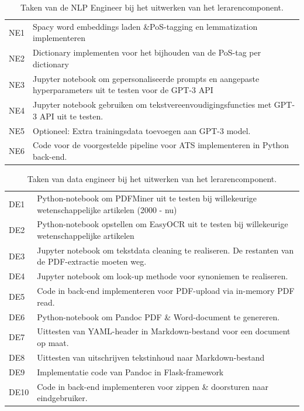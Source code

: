 \begin{center}
	\begin{table}[H]
		\begin{tabular}{ | m{2cm} | m{12cm} | } 
			\hline
			NE1 & Spacy word embeddings laden \&PoS-tagging en lemmatization implementeren \\
			NE2 & Dictionary implementen voor het bijhouden van de PoS-tag per dictionary \\
			NE3 & Jupyter notebook om gepersonaliseerde prompts en aangepaste hyperparameters uit te testen voor de GPT-3 API \\
			NE4 & Jupyter notebook gebruiken om tekstvereenvoudigingsfuncties met GPT-3 API uit te testen. \\
			NE5 & Optioneel: Extra trainingsdata toevoegen aan GPT-3 model. \\
			NE6 & Code voor de voorgestelde pipeline voor ATS implementeren in Python back-end. \\
			\hline
		\end{tabular}
		\caption{Taken van de NLP Engineer bij het uitwerken van het lerarencomponent.}
		\label{table:tasks-nlp-engineer}
	\end{table}
\end{center}


\begin{center}
	\begin{table}[H]
		\begin{tabular}{|m{2cm}|m{12cm}|}
			\hline
			DE1	& Python-notebook om PDFMiner uit te testen bij willekeurige wetenschappelijke artikelen (2000 - nu) \\
			DE2 & Python-notebook opstellen om EasyOCR uit te testen bij willekeurige wetenschappelijke artikelen \\
			DE3 & Jupyter notebook om tekstdata cleaning te realiseren. De restanten van de PDF-extractie moeten weg. \\
			DE4 & Jupyter notebook om look-up methode voor synoniemen te realiseren. \\
			DE5 & Code in back-end implementeren voor PDF-upload via in-memory PDF read. \\
			DE6 & Python-notebook om Pandoc PDF \& Word-document te genereren. \\
			DE7 & Uittesten van YAML-header in Markdown-bestand voor een document op maat. \\
			DE8 & Uittesten van uitschrijven tekstinhoud naar Markdown-bestand \\
			DE9 & Implementatie code van Pandoc in Flask-framework \\
			DE10 & Code in back-end implementeren voor zippen \& doorsturen naar eindgebruiker. \\
			\hline
		\end{tabular}
			\caption{Taken van data engineer bij het uitwerken van het lerarencomponent.}
			\label{table:tasks-data-engineer}
	\end{table}
\end{center}

